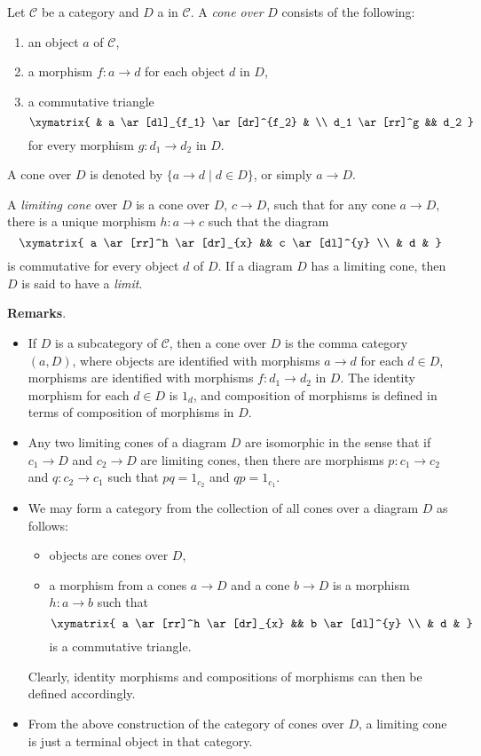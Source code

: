 \documentclass[12pt]{article}
\begin{document}
Let $\mathcal{C}$ be a category and $D$ a  in $\mathcal{C}$.  A \emph{cone over} $D$ consists of the following:

\begin{enumerate}
\item an object $a$ of $\mathcal{C}$,
\item a morphism $f:a\to d$ for each object $d$ in $D$,
\item a commutative triangle 
$$\xymatrix{
& a \ar[dl]_{f_1} \ar[dr]^{f_2} & \\
d_1 \ar[rr]^g && d_2
}
$$
for every morphism $g:d_1\to d_2$ in $D$.
\end{enumerate}

A cone over $D$ is denoted by $\lbrace a\to d\mid d\in D\rbrace$, or simply $a\to D$.

A \emph{limiting cone} over $D$ is a cone over $D$, $c\to D$, such that for any cone $a\to D$, there is a unique morphism $h: a\to c$ such that the diagram 
$$\xymatrix{
a \ar[rr]^h \ar[dr]_{x} && c \ar[dl]^{y} \\
& d & 
}
$$
is commutative for every object $d$ of $D$.  If a diagram $D$ has a limiting cone, then $D$ is said to have a \emph{limit}.  

\textbf{Remarks}.
\begin{itemize}
\item If $D$ is a subcategory of $\mathcal{C}$, then a cone over $D$ is the comma category $(a,D)$, where objects are identified with morphisms $a\to d$ for each $d\in D$, morphisms are identified with morphisms $f:d_1\to d_2$ in $D$.  The identity morphism for each $d\in D$ is $1_d$, and composition of morphisms is defined in terms of composition of morphisms in $D$.
\item Any two limiting cones of a diagram $D$ are isomorphic in the sense that if $c_1\to D$ and $c_2\to D$ are limiting cones, then there are morphisms $p:c_1\to c_2$ and $q:c_2\to c_1$ such that $pq=1_{c_2}$ and $qp=1_{c_1}$.
\item We may form a category from the collection of all cones over a diagram $D$  as follows:
\begin{itemize}
\item objects are cones over $D$,
\item a morphism from a cones $a\to D$ and a cone $b\to D$ is a morphism $h: a\to b$ such that 
$$\xymatrix{
a \ar[rr]^h \ar[dr]_{x} && b \ar[dl]^{y} \\
& d & 
}
$$
is a commutative triangle.
\end{itemize}
Clearly, identity morphisms and compositions of morphisms can then be defined accordingly.
\item From the above construction of the category of cones over $D$, a limiting cone is just a terminal object in that category.
\end{itemize}
\end{document}
